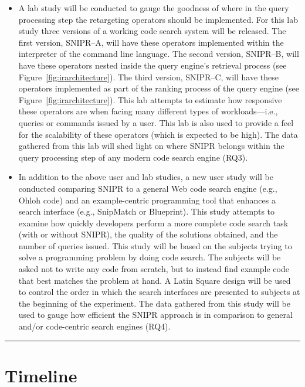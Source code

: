 \begin{itemize}
\item A lab study will be conducted to gauge the goodness of where in the query processing step the retargeting operators should be implemented. For this lab study three versions of a working code search system will be released. The first version, \uppercase{SnipR}--A, will have these operators implemented within the interpreter of the command line language. The second version, \uppercase{SnipR}--B, will have these operators nested inside the query engine's retrieval process (see Figure~\ref{fig:irarchitecture}). The third version, \uppercase{SnipR}--C, will have these operators implemented as part of the ranking process of the query engine (see Figure~\ref{fig:irarchitecture}). This lab attempts to estimate how responsive these operators are when facing many different types of workloads---i.e., queries or commands issued by a user. This lab is also used to provide a feel for the scalability of these operators (which is expected to be high). The data gathered from this lab will shed light on where \uppercase{SnipR} belongs within the query processing step of any modern code search engine (RQ3). 

\item In addition to the above user and lab studies, a new user study will be conducted comparing \uppercase{SnipR} to a general Web code search engine (e.g., Ohloh code) and an example-centric programming tool that enhances a search interface (e.g., SnipMatch or Blueprint). This study attempts to examine how quickly developers perform a more complete code search task (with or without \uppercase{SnipR}), the quality of the solutions obtained, and the number of queries issued. This study will be based on the subjects trying to solve a programming problem by doing code search. The subjects will be asked not to write any code from scratch, but to instead find example code that best matches the problem at hand. A Latin Square design will be used to control the order in which the search interfaces are presented to subjects at the beginning of the experiment. The data gathered from this study will be used to gauge how efficient the \uppercase{SnipR} approach is in comparison to general and/or code-centric search engines (RQ4).     
\end{itemize}

\fancybreak{\pfbreakdisplay}

\section{Timeline}
\label{sec:workplan}

